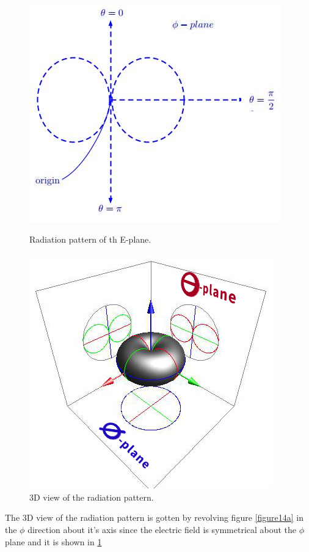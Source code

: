 \begin{figure}[!tbp]
\centering
\begin{minipage}[b]{0.4\textwidth}
\includegraphics[width=.8\linewidth]{./graphics/diagram3a}
\caption{Radiation pattern of th E-plane.}
\label{figure14a}
\end{minipage}
\hfill
\begin{minipage}[b]{0.4\textwidth}
\includegraphics[width=.8\linewidth]{"./graphics/3D view radiation pattern"}
\caption{3D view of the radiation pattern.}
\label{figure14b}
\end{minipage}
\end{figure}

The 3D view of the radiation pattern is gotten by revolving figure \ref{figure14a} in the $\phi$ direction about it's axis since the electric field is symmetrical about the $\phi$ plane and it is shown in \ref{figure14b}


